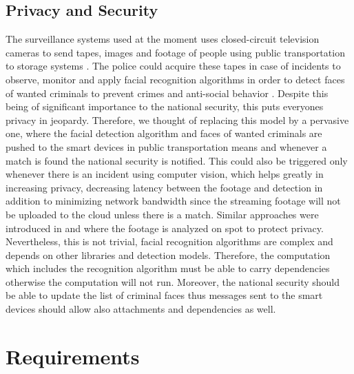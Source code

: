 \subsection{Privacy and Security}
The surveillance systems used at the moment uses closed-circuit television cameras to send  tapes, images and footage of people using public transportation to  storage systems \cite{Ashby2017} . The police could acquire  these tapes in case of incidents  to  observe, monitor and  apply facial recognition algorithms in order to  detect faces of wanted criminals  to prevent crimes and anti-social behavior \cite{cctv}. Despite this being of  significant importance to the national security, this puts everyones privacy in jeopardy. Therefore, we thought of replacing this model by a pervasive one, where  the facial detection algorithm and faces of  wanted criminals are pushed to the smart devices in public transportation means and whenever a match is found the national security is notified. This could also be  triggered only whenever there is an incident using computer vision, which helps greatly in increasing privacy, decreasing  latency between the footage and detection in addition to minimizing network bandwidth since the streaming footage  will not be uploaded to the cloud unless there is a match. Similar approaches were introduced in \cite{4653063} and \cite{winkler2010trustcam} where the footage is analyzed on spot to protect privacy. Nevertheless, this is not trivial, facial recognition algorithms are complex and depends on other libraries and  detection models. Therefore, the computation which includes the recognition algorithm  must be able to carry dependencies otherwise the computation will not run. Moreover, the national security should be able to update the list of criminal faces thus messages sent to the smart devices should allow also attachments and dependencies as well. 


\section{Requirements} \label{sec:requirements}


